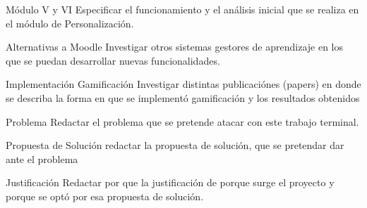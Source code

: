 
\begin{Actividad}{Módulo V y VI}{%
    Especificar el funcionamiento y el análisis inicial que se realiza en el módulo de Personalización.}
    \PBitem {}%
\end{Actividad}


\begin{Actividad}{Alternativas a Moodle}{%
    Investigar otros sistemas gestores de aprendizaje en los que se puedan desarrollar nuevas funcionalidades.}
    \PBitem {}%
\end{Actividad}


\begin{Actividad}{Implementación Gamificación}{%
    Investigar distintas publicaciónes (papers) en donde se describa la forma en que se implementó gamificación y los resultados obtenidos}
    \PBitem {}%
\end{Actividad}



\begin{Actividad}{Problema}{%
    Redactar el problema que se pretende atacar con este trabajo terminal.}
    \PBitem {}%
\end{Actividad}

\begin{Actividad}{Propuesta de Solución}{%
    redactar la propuesta de solución, que se pretendar dar ante el problema}
    \PBitem {}%
\end{Actividad}

\begin{Actividad}{Justificación}{%
    Redactar por que la justificación de porque surge el proyecto y porque se optó por esa propuesta de solución.}
    \PBitem {}%
\end{Actividad}


